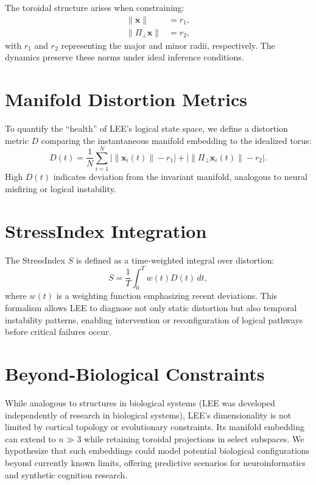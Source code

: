 \documentclass[12pt]{article}
\begin{document}
The toroidal structure arises when constraining:
\begin{align}
\|\mathbf{x}\| &= r_1, \\
\|\Pi_{\perp} \mathbf{x}\| &= r_2,
\end{align}
with $r_1$ and $r_2$ representing the major and minor radii, respectively. The dynamics preserve these norms under ideal inference conditions.

\section{Manifold Distortion Metrics}
To quantify the ``health'' of LEE's logical state space, we define a distortion metric $D$ comparing the instantaneous manifold embedding to the idealized torus:
\begin{equation}
D(t) = \frac{1}{N} \sum_{i=1}^N \left| \|\mathbf{x}_i(t)\| - r_1 \right| + \left| \|\Pi_{\perp} \mathbf{x}_i(t)\| - r_2 \right|.
\end{equation}
High $D(t)$ indicates deviation from the invariant manifold, analogous to neural misfiring or logical instability.

\section{StressIndex Integration}
The StressIndex $S$ is defined as a time-weighted integral over distortion:
\begin{equation}
S = \frac{1}{T} \int_{0}^{T} w(t) D(t) \, dt,
\end{equation}
where $w(t)$ is a weighting function emphasizing recent deviations. 
This formalism allows LEE to diagnose not only static distortion but also temporal instability patterns, enabling intervention or reconfiguration of logical pathways before critical failures occur.

\section{Beyond-Biological Constraints}
While analogous to structures in biological systems (LEE was developed independently of research in biological systems), LEE's dimensionality is not limited by cortical topology or evolutionary constraints. 
Its manifold embedding can extend to $n \gg 3$ while retaining toroidal projections in select subspaces. 
We hypothesize that such embeddings could model potential biological configurations beyond currently known limits, offering predictive scenarios for neuroinformatics and synthetic cognition research.
\end{document}
